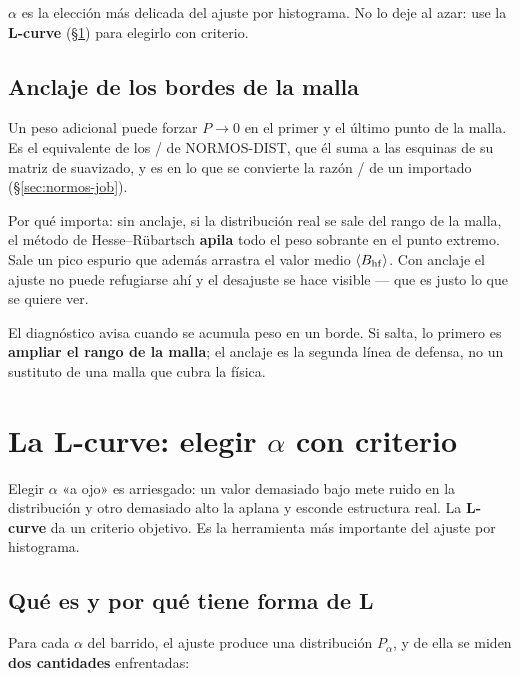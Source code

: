 \begin{aviso}
$\alpha$ es la elección más delicada del ajuste por histograma. No lo deje al
azar: use la \textbf{L-curve} (§\ref{sec:lcurve}) para elegirlo con criterio.
\end{aviso}

\subsection{Anclaje de los bordes de la malla}
\label{sec:edge-anchor}

Un peso adicional puede forzar $P \to 0$ en el primer y el último punto de la
malla. Es el equivalente de los / de NORMOS-DIST, que
él suma a las esquinas de su matriz de suavizado, y es en lo que se convierte la
razón / de un  importado
(\S\ref{sec:normos-job}).

Por qué importa: sin anclaje, si la distribución real se sale del rango de la
malla, el método de Hesse--Rübartsch \textbf{apila} todo el peso sobrante en el
punto extremo. Sale un pico espurio que además arrastra el valor medio
$\langle B_{\mathrm{hf}} \rangle$. Con anclaje el ajuste no puede refugiarse ahí y el
desajuste se hace visible --- que es justo lo que se quiere ver.

\begin{truco}
El diagnóstico  avisa cuando se acumula peso en un borde. Si
salta, lo primero es \textbf{ampliar el rango de la malla}; el anclaje es la
segunda línea de defensa, no un sustituto de una malla que cubra la física.
\end{truco}

\section{La L-curve: elegir $\alpha$ con criterio}
\label{sec:lcurve}

Elegir $\alpha$ «a ojo» es arriesgado: un valor demasiado bajo mete ruido en la
distribución y otro demasiado alto la aplana y esconde estructura real. La
\textbf{L-curve} da un criterio objetivo. Es la herramienta más importante del
ajuste por histograma.

\subsection{Qué es y por qué tiene forma de L}

Para cada $\alpha$ del barrido, el ajuste produce una distribución $P_\alpha$, y de
ella se miden \textbf{dos cantidades} enfrentadas:

